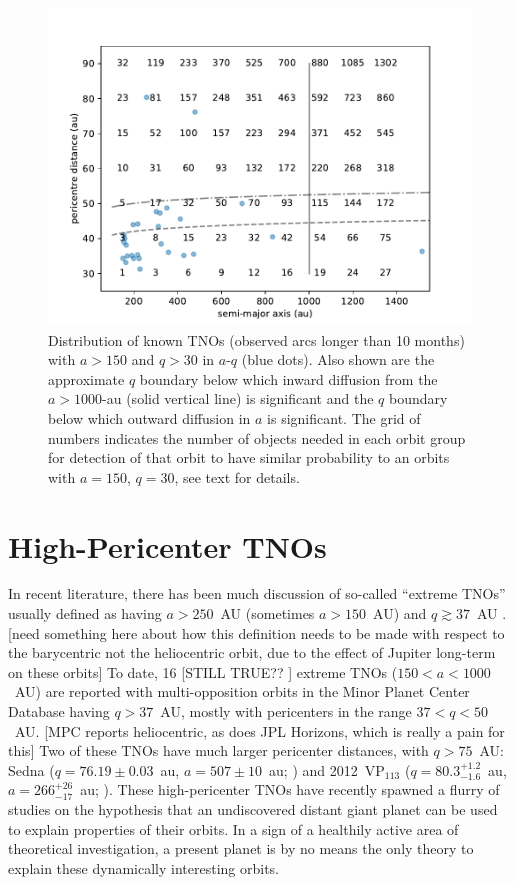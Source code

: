 \documentclass{aastex62}
\begin{document}
\begin{figure}
\centering
\includegraphics[width=\textwidth]{figure1.pdf}
\caption{Distribution of known TNOs (observed arcs longer than 10 months) with $a > 150$ and $q > 30$ in $a$-$q$ (blue dots).  Also shown are the approximate $q$ boundary below which inward diffusion from the $a > 1000$-au (solid vertical line)  is significant and the $q$ boundary below which outward diffusion in $a$ is significant. The grid of numbers indicates the number of objects needed in each orbit group for detection of that orbit to have similar probability to an orbits with $a = 150$, $q = 30$, see text for details.}
\label{fig:bias}
\end{figure}

\section{High-Pericenter TNOs} \label{sec:highq}

In recent literature, there has been much discussion of so-called ``extreme TNOs'' usually defined as having $a>250$~AU (sometimes $a>150$~AU) and $q\gtrsim37$~AU \citep{Sheppardetal2016,bannister17}.
[need something here about how this definition needs to be made with respect to the barycentric not the heliocentric orbit, due to the effect of Jupiter long-term on these orbits]
To date, 16 [STILL TRUE?? ] extreme TNOs ($150<a<1000$~AU) are reported with multi-opposition orbits in the Minor Planet Center Database having $q>37$~AU, mostly with pericenters in the range $37<q<50$~AU.
[MPC reports heliocentric, as does JPL Horizons, which is really a pain for this]
Two of these TNOs have much larger pericenter distances, with $q>75$~AU: Sedna ($q=76.19 \pm 0.03$~au, $a=507 \pm 10$~au; \citealt{brownetal04}) and 2012~VP$_{113}$ ($q=80.3^{+1.2}_{-1.6}$~au, $a = 266^{+26}_{-17}$~au; \citealt{trujillosheppard14}). 
These high-pericenter TNOs have recently spawned a flurry of studies on the hypothesis that an undiscovered distant giant planet can be used to explain properties of their orbits. 
In a sign of a healthily active area of theoretical investigation, a present planet is by no means the only theory to explain these dynamically interesting orbits.
\end{document}
